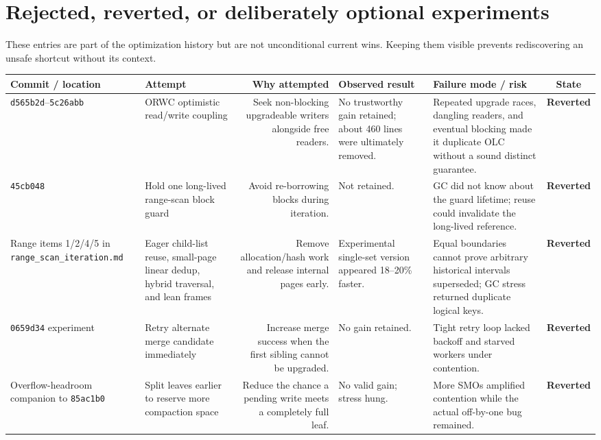 \documentclass[10pt,a4paper,landscape]{article}
\newcommand{\code}[1]{\texttt{#1}}
\newcommand{\commit}[1]{\code{#1}}
\newcommand{\statereverted}{\textbf{Reverted}}
\begin{document}
\section{Rejected, reverted, or deliberately optional experiments}

These entries are part of the optimization history but are not unconditional current
wins. Keeping them visible prevents rediscovering an unsafe shortcut without its context.

\begin{longtable}{IORGKS}
\toprule
\textbf{Commit / location} & \textbf{Attempt} & \textbf{Why attempted} &
\textbf{Observed result} & \textbf{Failure mode / risk} & \textbf{State} \\
\midrule
\endhead
\commit{d565b2d}--\commit{5c26abb} & ORWC optimistic read/write coupling & Seek
non-blocking upgradeable writers alongside free readers. & No trustworthy gain retained;
about 460 lines were ultimately removed. & Repeated upgrade races, dangling readers, and
eventual blocking made it duplicate OLC without a sound distinct guarantee. & \statereverted \\

\commit{45cb048} & Hold one long-lived range-scan block guard & Avoid re-borrowing blocks
during iteration. & Not retained. & GC did not know about the guard lifetime; reuse could
invalidate the long-lived reference. & \statereverted \\

Range items 1/2/4/5 in \code{range\_scan\_iteration.md} & Eager child-list reuse, small-page
linear dedup, hybrid traversal, and lean frames & Remove allocation/hash work and release
internal pages early. & Experimental single-set version appeared 18--20\% faster. & Equal
boundaries cannot prove arbitrary historical intervals superseded; GC stress returned
duplicate logical keys. & \statereverted \\

\commit{0659d34} experiment & Retry alternate merge candidate immediately & Increase
merge success when the first sibling cannot be upgraded. & No gain retained. & Tight
retry loop lacked backoff and starved workers under contention. & \statereverted \\

Overflow-headroom companion to \commit{85ac1b0} & Split leaves earlier to reserve more
compaction space & Reduce the chance a pending write meets a completely full leaf. & No
valid gain; stress hung. & More SMOs amplified contention while the actual off-by-one bug
remained. & \statereverted \\


\end{longtable}
\end{document}
